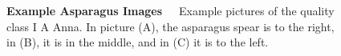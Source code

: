\begin{figure}
    \centering
    \qquad
    \qquad
    \caption[Example Asparagus Images]{\textbf{Example Asparagus Images}~~~Example pictures of the quality class I A Anna. In picture (A), the asparagus spear is to the right, in (B), it is in the middle, and in (C) it is to the left.}
    \label{fig:ExampleImagesAnna}
\end{figure}

